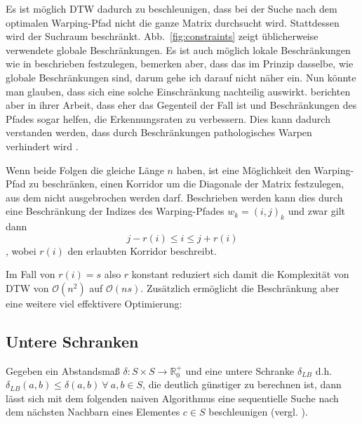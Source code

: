 Es ist möglich DTW dadurch zu beschleunigen, dass bei der Suche nach dem optimalen Warping-Pfad nicht die ganze Matrix durchsucht wird. Stattdessen wird der Suchraum beschränkt. Abb.~\ref{fig:constraints} zeigt üblicherweise verwendete globale Beschränkungen. Es ist auch möglich lokale Beschränkungen wie in \cite{Rabiner:1993p11752} beschrieben festzulegen, \citet{Keogh:2005p7751} bemerken aber, dass das im Prinzip dasselbe, wie globale Beschränkungen sind, darum gehe ich darauf nicht näher ein. Nun könnte man glauben, dass sich eine solche Einschränkung nachteilig auswirkt. \citet{Ratanamahatana:2004p7522} berichten aber in ihrer Arbeit, dass eher das Gegenteil der Fall ist und Beschränkungen des Pfades sogar helfen, die Erkennungsraten zu verbessern. Dies kann dadurch verstanden werden, dass durch Beschränkungen pathologisches Warpen verhindert wird \cite{Keogh:2005p7751}.

Wenn beide Folgen die gleiche Länge $n$ haben, ist eine Möglichkeit den Warping-Pfad zu beschränken, einen Korridor um die Diagonale der Matrix festzulegen, aus dem nicht ausgebrochen werden darf. Beschrieben werden kann dies durch eine Beschränkung der Indizes des Warping-Pfades \( w_k = (i,j)_k \) und zwar gilt dann
\begin{equation}
  \label{eq:constraints}
  j−r(i) \leq i \leq j+r(i)
\end{equation}
, wobei $r(i)$ den erlaubten Korridor beschreibt.

Im Fall von \(r(i) = s\) also $r$ konstant reduziert sich damit die Komplexität von DTW von \( \mathcal{O}(n^2) \) auf \( \mathcal{O}(ns) \). Zusätzlich ermöglicht die Beschränkung aber eine weitere viel effektivere Optimierung:

\subsection{Untere Schranken} %
\label{sub:lower_bounding}

Gegeben ein Abstandsmaß \( \delta : S\times S \rightarrow \mathbb{R}_0^+ \) und eine untere Schranke \( \delta_{LB} \) d.h. \( \delta_{LB}(a,b) \leq \delta(a,b) ~\forall~ a,b \in S \), die deutlich günstiger zu berechnen ist, dann lässt sich mit dem folgenden naiven Algorithmus eine sequentielle Suche nach dem nächsten Nachbarn eines Elementes \( c \in S \) beschleunigen (vergl. \cite{Keogh:2005p7751}).

